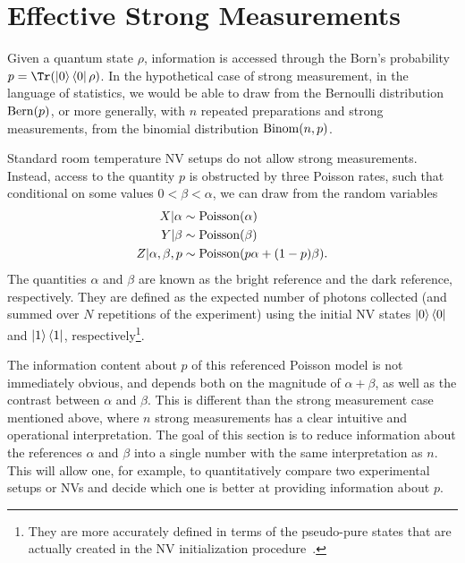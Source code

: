\documentclass[aps,nofootinbib,twocolumn,superscriptaddress]{revtex4}
\begin{document}
\section{Effective Strong Measurements}
\label{apx:effective-strong-measurements}

Given a quantum state $\rho$, 
information is accessed through the
Born's probability $p=\Tr(\ketbra{0}\rho)$.
In the hypothetical case of strong measurement, in the language
of statistics, we would be able to draw from 
the Bernoulli distribution $\operatorname{Bern}(p)$, or more generally, with 
$n$ repeated preparations and strong measurements, from 
the binomial distribution $\operatorname{Binom}(n,p)$.

Standard room temperature NV setups do not allow strong measurements. 
Instead, access to the quantity $p$ is obstructed by three Poisson rates,
such that conditional on some values $0<\beta<\alpha$, we can 
draw from the random variables
\begin{align}
    X|\alpha &\sim \operatorname{Poisson}(\alpha) \nonumber \\
    Y|\beta &\sim \operatorname{Poisson}(\beta) \nonumber \\
    Z|\alpha,\beta,p &\sim \operatorname{Poisson}(p\alpha + (1-p)\beta).
\end{align}
The quantities $\alpha$ and $\beta$ are known as the bright reference
and the dark reference, respectively.
They are defined as the 
expected number of photons collected (and summed over $N$
repetitions of the experiment) using the initial NV states
$\ket{0}\bra{0}$ and $\ket{1}\bra{1}$, respectively\footnote{They are
more accurately defined in terms of the pseudo-pure states 
that are actually created in the NV initialization procedure~\cite{hincks_statistical_2018}.}.

The information content about $p$ of this referenced Poisson model is not
immediately obvious, 
and depends both on the magnitude of $\alpha+\beta$, 
as well as the contrast between $\alpha$ and $\beta$.
This is different than the strong measurement case mentioned above,
where $n$ strong measurements has a clear intuitive and operational 
interpretation.
The goal of this section is to reduce information about the references
$\alpha$ and $\beta$ into a single number 
with the same interpretation as $n$.
This will allow one, for example,
to quantitatively compare two experimental setups or NVs and
decide which one is better at providing information about $p$. 
\end{document}
